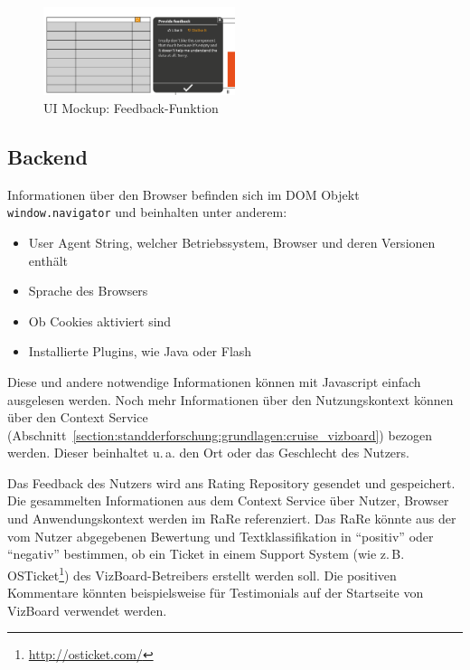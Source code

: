 \documentclass[
	headsepline,
	footsepline,
	fontsize=12pt,
	bibliography=totoc
]{scrbook}
\begin{document}
\begin{figure}[htbp]
   \centering
   \includegraphics[width=0.5\textwidth]{images/konzeption-reporting.png}
   \caption{UI Mockup: Feedback-Funktion}
   \label{figure:feedback}
\end{figure}

\subsection{Backend}
\label{section:konzeption:feedback:backend}

Informationen über den Browser befinden sich im DOM Objekt \texttt{window.navigator} und beinhalten unter anderem:

\begin{itemize}
	\item User Agent String, welcher Betriebssystem, Browser und deren Versionen enthält
	\item Sprache des Browsers
	\item Ob Cookies aktiviert sind
	\item Installierte Plugins, wie Java oder Flash
\end{itemize}


Diese und andere notwendige Informationen können mit Javascript einfach ausgelesen werden. Noch mehr Informationen über den Nutzungskontext können über den Context Service (Abschnitt~\ref{section:standderforschung:grundlagen:cruise_vizboard}) bezogen werden. Dieser beinhaltet u.\,a. den Ort oder das Geschlecht des Nutzers.


Das Feedback des Nutzers wird ans Rating Repository gesendet und gespeichert. Die gesammelten Informationen aus dem Context Service über Nutzer, Browser und Anwendungskontext werden im RaRe referenziert. Das RaRe könnte aus der vom Nutzer abgegebenen Bewertung und Textklassifikation \cite{Sebastiani2002} in \enquote{positiv} oder \enquote{negativ} bestimmen, ob ein Ticket in einem Support System (wie z.\,B. OSTicket\footnote{\url{http://osticket.com/}}) des VizBoard-Betreibers erstellt werden soll. Die positiven Kommentare könnten beispielsweise für Testimonials auf der Startseite von VizBoard verwendet werden.
\end{document}
